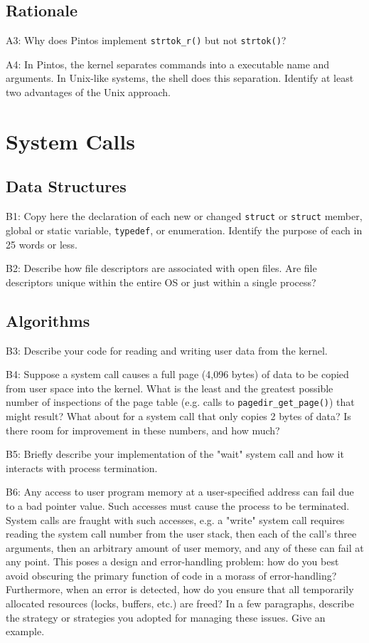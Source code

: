 \documentclass[journal]{IEEEtran}
\begin{document}
\subsection{Rationale}
A3: Why does Pintos implement \lstinline{strtok_r()} but not \lstinline{strtok()}?

A4: In Pintos, the kernel separates commands into a executable name and arguments.  In Unix-like systems, the shell does this separation.  Identify at least two advantages of the Unix approach.
\section{System Calls}

\subsection{Data Structures}
B1: Copy here the declaration of each new or changed \lstinline{struct}  or \lstinline{struct} member, global or static variable, \lstinline{typedef}, or enumeration.  Identify the purpose of each in 25 words or less.

B2: Describe how file descriptors are associated with open files. Are file descriptors unique within the entire OS or just within a single process?
\subsection{Algorithms}
B3: Describe your code for reading and writing user data from the kernel.

B4: Suppose a system call causes a full page (4,096 bytes) of data to be copied from user space into the kernel.  What is the least and the greatest possible number of inspections of the page table (e.g. calls to \lstinline{pagedir_get_page()}) that might result?  What about for a system call that only copies 2 bytes of data?  Is there room for improvement in these numbers, and how much?

B5: Briefly describe your implementation of the "wait" system call and how it interacts with process termination.

B6: Any access to user program memory at a user-specified address can fail due to a bad pointer value.  Such accesses must cause the process to be terminated.  System calls are fraught with such accesses, e.g. a "write" system call requires reading the system call number from the user stack, then each of the call's three arguments, then an arbitrary amount of user memory, and any of these can fail at any point.  This poses a design and error-handling problem: how do you best avoid obscuring the primary function of code in a morass of error-handling?  Furthermore, when an error is detected, how do you ensure that all temporarily allocated resources (locks, buffers, etc.) are freed?  In a few paragraphs, describe the strategy or strategies you adopted for managing these issues.  Give an example.
\end{document}
